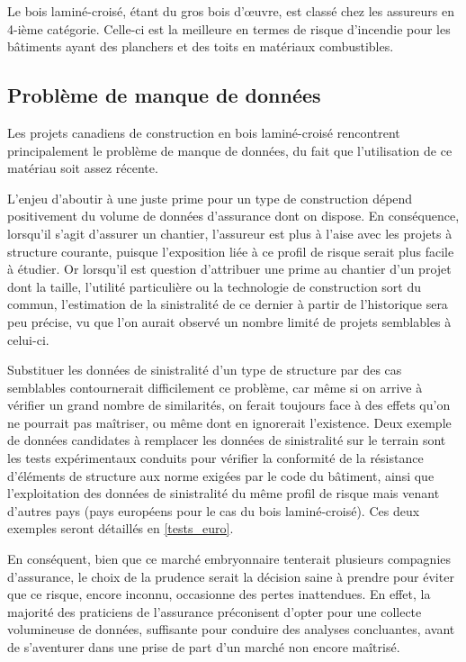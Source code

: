 \documentclass[11pt]{article}
\begin{document}
Le bois laminé-croisé, étant du gros bois d'œuvre, est classé chez les assureurs en 4-ième catégorie. Celle-ci est la meilleure en termes de risque d'incendie pour les bâtiments ayant des planchers et des toits en matériaux combustibles. 

\subsection{Problème de manque de données}

Les projets canadiens de construction en bois laminé-croisé rencontrent principalement le problème de manque de données, du fait que l'utilisation de ce matériau soit assez récente.

L'enjeu d'aboutir à une juste prime pour un type de construction dépend positivement du volume de données d'assurance dont on dispose. En conséquence, lorsqu'il s'agit d'assurer un chantier, l'assureur est plus à l'aise avec les projets à structure courante, puisque l'exposition liée à ce profil de risque serait plus facile à étudier. Or lorsqu'il est question d'attribuer une prime au chantier d'un projet dont la taille, l'utilité particulière ou la technologie de construction sort du commun, l'estimation de la sinistralité de ce dernier à partir de l'historique sera peu précise, vu que l'on aurait observé un nombre limité de projets semblables à celui-ci. 

Substituer les données de sinistralité d'un type de structure par des cas semblables contournerait difficilement ce problème, car même si on arrive à vérifier un grand nombre de similarités, on ferait toujours face à des effets qu'on ne pourrait pas maîtriser, ou même dont en ignorerait l'existence. Deux exemple de données candidates à remplacer les données de sinistralité sur le terrain sont les tests expérimentaux conduits pour vérifier la conformité de la résistance d'éléments de structure aux norme exigées par le code du bâtiment, ainsi que l'exploitation des données de sinistralité du même profil de risque mais venant d'autres pays (pays européens pour le cas du bois laminé-croisé). Ces deux exemples seront détaillés en \ref{tests_euro}.

En conséquent, bien que ce marché embryonnaire tenterait plusieurs compagnies d'assurance, le choix de la prudence serait la décision saine à prendre pour éviter que ce risque, encore inconnu, occasionne des pertes inattendues. En effet, la majorité des praticiens de l'assurance préconisent d'opter pour une collecte volumineuse de données, suffisante pour conduire des analyses concluantes, avant de s'aventurer dans une prise de part d'un marché non encore maîtrisé.
\end{document}
